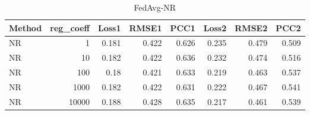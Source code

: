 \begin{table}
\caption{FedAvg-NR}
\begin{tabular}{lrrrrrrr}
\toprule
Method & reg_coeff & Loss1 & RMSE1 & PCC1 & Loss2 & RMSE2 & PCC2 \\
\midrule
NR & 1 & 0.181 & 0.422 & 0.626 & 0.235 & 0.479 & 0.509 \\
NR & 10 & 0.182 & 0.422 & 0.636 & 0.232 & 0.474 & 0.516 \\
NR & 100 & 0.18 & 0.421 & 0.633 & 0.219 & 0.463 & 0.537 \\
NR & 1000 & 0.182 & 0.422 & 0.631 & 0.222 & 0.467 & 0.541 \\
NR & 10000 & 0.188 & 0.428 & 0.635 & 0.217 & 0.461 & 0.539 \\
\bottomrule
\end{tabular}
\end{table}

